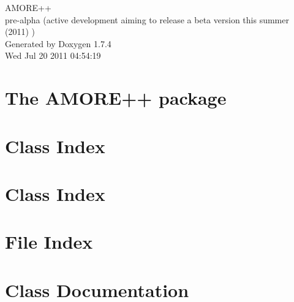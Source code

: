 \documentclass[a4paper]{book}
\begin{document}
\hypersetup{pageanchor=false}
\begin{titlepage}
\vspace*{7cm}
\begin{center}
{\Large AMORE++ \\[1ex]\large pre-\/alpha (active development aiming to release a beta version this summer (2011) ) }\\
\vspace*{1cm}
{\large Generated by Doxygen 1.7.4}\\
\vspace*{0.5cm}
{\small Wed Jul 20 2011 04:54:19}\\
\end{center}
\end{titlepage}
\clearemptydoublepage
{}
\tableofcontents
\clearemptydoublepage
{}
\hypersetup{pageanchor=true}
\chapter{The AMORE++ package}
\label{index}\hypertarget{index}{}
\chapter{Class Index}

\chapter{Class Index}

\chapter{File Index}

\chapter{Class Documentation}

















































\end{document}
